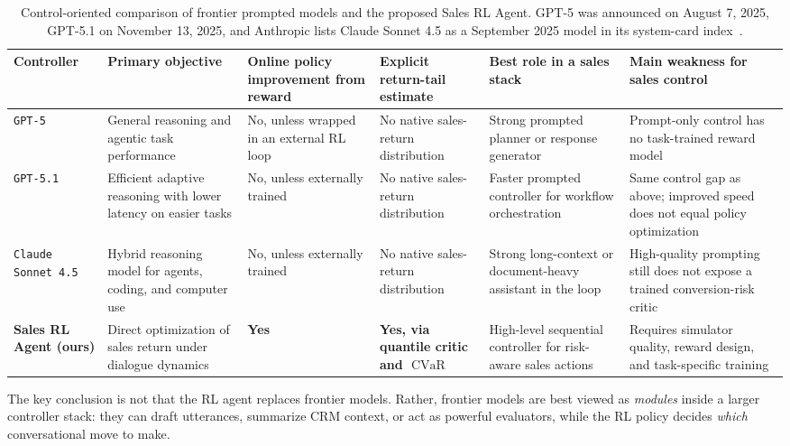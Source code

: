 \documentclass[conference]{IEEEtran}
\newcommand{\cvar}{\operatorname{CVaR}}
\begin{document}
\begin{table}[t]
\centering
\caption{Control-oriented comparison of frontier prompted models and the proposed Sales RL Agent. GPT-5 was announced on August 7, 2025, GPT-5.1 on November 13, 2025, and Anthropic lists Claude Sonnet 4.5 as a September 2025 model in its system-card index~\cite{openai_gpt5,openai_gpt51,anthropic_cards,anthropic_sonnet}.}
\label{tab:frontiercomparison}
\begin{tabularx}{\textwidth}{lYYYYY}
\toprule
\textbf{Controller} & \textbf{Primary objective} & \textbf{Online policy improvement from reward} & \textbf{Explicit return-tail estimate} & \textbf{Best role in a sales stack} & \textbf{Main weakness for sales control} \\
\midrule
\texttt{GPT-5} & General reasoning and agentic task performance & No, unless wrapped in an external RL loop & No native sales-return distribution & Strong prompted planner or response generator & Prompt-only control has no task-trained reward model \\
\texttt{GPT-5.1} & Efficient adaptive reasoning with lower latency on easier tasks & No, unless externally trained & No native sales-return distribution & Faster prompted controller for workflow orchestration & Same control gap as above; improved speed does not equal policy optimization \\
\texttt{Claude Sonnet 4.5} & Hybrid reasoning model for agents, coding, and computer use & No, unless externally trained & No native sales-return distribution & Strong long-context or document-heavy assistant in the loop & High-quality prompting still does not expose a trained conversion-risk critic \\
\textbf{Sales RL Agent (ours)} & Direct optimization of sales return under dialogue dynamics & \textbf{Yes} & \textbf{Yes, via quantile critic and \(\cvar\)} & High-level sequential controller for risk-aware sales actions & Requires simulator quality, reward design, and task-specific training \\
\bottomrule
\end{tabularx}
\end{table}

The key conclusion is not that the RL agent replaces frontier models. Rather, frontier models are best viewed as \emph{modules} inside a larger controller stack: they can draft utterances, summarize CRM context, or act as powerful evaluators, while the RL policy decides \emph{which} conversational move to make.
\end{document}
